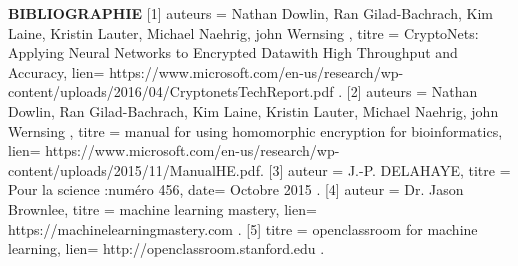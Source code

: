 \documentclass[a4paper,11pt]{report}
\begin{document}
\newpage
\textbf{BIBLIOGRAPHIE}\newline
\newline 
\scriptsize
[1]{
auteurs = {Nathan Dowlin, Ran Gilad-Bachrach, Kim Laine, Kristin Lauter, Michael Naehrig, john Wernsing  },
titre = {CryptoNets: Applying Neural Networks to Encrypted Datawith High Throughput and Accuracy},
lien= {https://www.microsoft.com/en-us/research/wp-content/uploads/2016/04/CryptonetsTechReport.pdf .}}
\newline
\newline
{[2]{
auteurs = {Nathan Dowlin, Ran Gilad-Bachrach, Kim Laine, Kristin Lauter, Michael Naehrig, john Wernsing  },
titre = {manual for using homomorphic encryption for bioinformatics},
lien= {https://www.microsoft.com/en-us/research/wp-content/uploads/2015/11/ManualHE.pdf.}}}
\newline
\newline
{[3]{
auteur = {J.-P. DELAHAYE},
titre = {Pour la science :numéro 456},
date= {Octobre 2015 .}}}
\newline
\newline
{[4]{
auteur = {Dr. Jason Brownlee},
titre = {machine learning mastery},
lien= {https://machinelearningmastery.com .}}}
\newline
\newline
{[5]{
titre = {openclassroom for machine learning},
lien= {http://openclassroom.stanford.edu .}}}
\newline
{}
\newline
\newline
\end{document}
